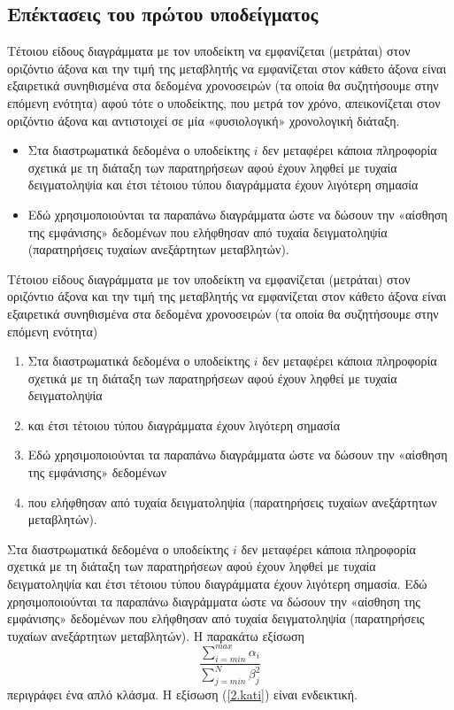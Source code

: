\documentclass[12pt,a4paper,oneside]{book}
\begin{document}
\subsection{Επέκτασεις του πρώτου υποδείγματος}
Τέτοιου είδους διαγράμματα με τον υποδείκτη να εμφανίζεται (μετράται) στον οριζόντιο άξονα και την τιμή της μεταβλητής να εμφανίζεται στον κάθετο άξονα είναι εξαιρετικά συνηθισμένα στα δεδομένα χρονοσειρών (τα οποία θα συζητήσουμε στην επόμενη ενότητα) αφού τότε ο υποδείκτης, που μετρά τον χρόνο, απεικονίζεται στον οριζόντιο άξονα και αντιστοιχεί σε μία «φυσιολογική» χρονολογική διάταξη.
\begin{itemize}
	\item Στα διαστρωματικά δεδομένα ο υποδείκτης $i$ δεν μεταφέρει κάποια πληροφορία σχετικά με τη διάταξη των παρατηρήσεων αφού έχουν ληφθεί με τυχαία δειγματοληψία και έτσι τέτοιου τύπου διαγράμματα έχουν λιγότερη σημασία
	\item Εδώ χρησιμοποιούνται τα παραπάνω διαγράμματα ώστε να δώσουν την «αίσθηση της εμφάνισης» δεδομένων που ελήφθησαν από τυχαία δειγματοληψία (παρατηρήσεις τυχαίων ανεξάρτητων μεταβλητών).
\end{itemize}

Τέτοιου είδους διαγράμματα με τον υποδείκτη να εμφανίζεται (μετράται) στον οριζόντιο άξονα και την τιμή της μεταβλητής να εμφανίζεται στον κάθετο άξονα είναι εξαιρετικά συνηθισμένα στα δεδομένα χρονοσειρών (τα οποία θα συζητήσουμε στην επόμενη ενότητα)
\begin{enumerate}
	\item Στα διαστρωματικά δεδομένα ο υποδείκτης $i$ δεν μεταφέρει κάποια πληροφορία σχετικά με τη διάταξη των παρατηρήσεων αφού έχουν ληφθεί με τυχαία δειγματοληψία
	\item και έτσι τέτοιου τύπου διαγράμματα έχουν λιγότερη σημασία
    \item Εδώ χρησιμοποιούνται τα παραπάνω διαγράμματα ώστε να δώσουν την «αίσθηση της εμφάνισης» δεδομένων
	\item που ελήφθησαν από τυχαία δειγματοληψία (παρατηρήσεις τυχαίων ανεξάρτητων μεταβλητών).
\end{enumerate} 

Στα διαστρωματικά δεδομένα ο υποδείκτης $i$ δεν μεταφέρει κάποια πληροφορία σχετικά με τη διάταξη των παρατηρήσεων αφού έχουν ληφθεί με τυχαία δειγματοληψία και έτσι τέτοιου τύπου διαγράμματα έχουν λιγότερη σημασία. Εδώ χρησιμοποιούνται τα παραπάνω διαγράμματα ώστε να δώσουν την «αίσθηση της εμφάνισης» δεδομένων που ελήφθησαν από τυχαία δειγματοληψία (παρατηρήσεις τυχαίων ανεξάρτητων μεταβλητών). Η παρακάτω εξίσωση
\begin{equation}
\dfrac{\sum \limits_{i=min}^{max} \alpha_{i}}{\sum \limits_{j=min}^{Ν} \beta_{j}^{2}}
\label{2.kati}
\end{equation}
περιγράφει ένα απλό κλάσμα. Η εξίσωση (\ref{2.kati}) είναι ενδεικτική.
\end{document}
